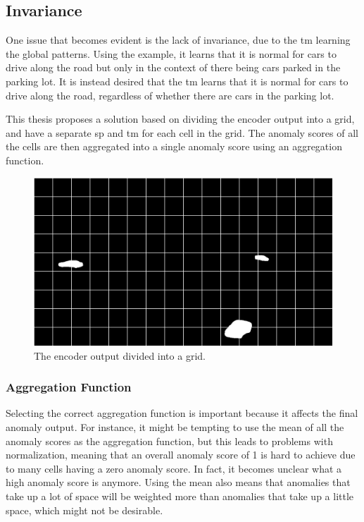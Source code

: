 \subsection{Invariance}
One issue that becomes evident is the lack of invariance, due to the \gls*{tm} learning the global patterns. Using the example, it learns that it is normal for cars to drive along the road but only in the context of there being cars parked in the parking lot. It is instead desired that the \gls*{tm} learns that it is normal for cars to drive along the road, regardless of whether there are cars in the parking lot.
\par
This thesis proposes a solution based on dividing the encoder output into a grid, and have a separate \gls*{sp} and \gls*{tm} for each cell in the grid. The anomaly scores of all the cells are then aggregated into a single anomaly score using an aggregation function.
\begin{figure}[H]
    \centering
    \includegraphics[width=\textwidth]{resources/methodology/car_segmentation_grid.png}
    \caption[Encoder Output Grid]{The encoder output divided into a grid.}
    \label{fig:grid}
\end{figure}
\subsubsection{Aggregation Function}
Selecting the correct aggregation function is important because it affects the final anomaly output. For instance, it might be tempting to use the mean of all the anomaly scores as the aggregation function, but this leads to problems with normalization, meaning that an overall anomaly score of 1 is hard to achieve due to many cells having a zero anomaly score. In fact, it becomes unclear what a high anomaly score is anymore. Using the mean also means that anomalies that take up a lot of space will be weighted more than anomalies that take up a little space, which might not be desirable.

